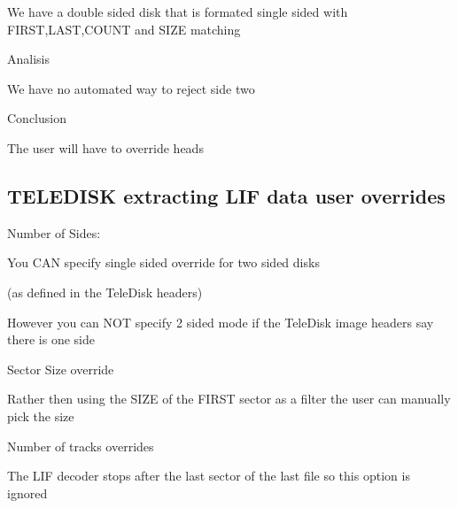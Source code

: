 \begin{DoxyItemize}
\begin{DoxyItemize}
\item We have a double sided disk that is formated single sided with F\+I\+R\+ST,L\+A\+ST,C\+O\+U\+NT and S\+I\+ZE matching
\end{DoxyItemize}
\item Analisis
\begin{DoxyItemize}
\item We have no automated way to reject side two
\end{DoxyItemize}
\item Conclusion
\begin{DoxyItemize}
\item The user will have to override heads
\end{DoxyItemize}
\end{DoxyItemize}





\subsection*{T\+E\+L\+E\+D\+I\+SK extracting L\+IF data user overrides}


\begin{DoxyItemize}
\item Number of Sides\+:
\begin{DoxyItemize}
\item You C\+AN specify single sided override for two sided disks
\begin{DoxyItemize}
\item (as defined in the Tele\+Disk headers)
\end{DoxyItemize}
\item However you can N\+OT specify 2 sided mode if the Tele\+Disk image headers say there is one side
\end{DoxyItemize}
\item Sector Size override
\begin{DoxyItemize}
\item Rather then using the S\+I\+ZE of the F\+I\+R\+ST sector as a filter the user can manually pick the size
\end{DoxyItemize}
\item Number of tracks overrides
\begin{DoxyItemize}
\item The L\+IF decoder stops after the last sector of the last file so this option is ignored 
\end{DoxyItemize}
\end{DoxyItemize}





